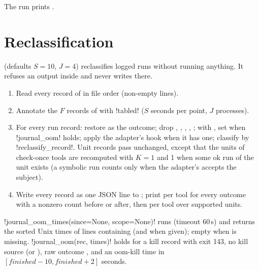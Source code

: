 The run prints .

\section{Reclassification}\label{sec:bench-reclassify}

 (defaults $S=10$, $J=4$) reclassifies logged runs without
running anything. It refuses an output inside  and never writes there.

\begin{algorithm}[Reclassification]
\begin{enumerate}
\item Read every record of  in file order (non-empty lines).
\item Annotate the $F$ records of  with \py!tabled! ($S$ seconds per point,
  $J$ processes).
\item For every run record: restore  as the outcome; drop ,
  , , , ; with
  , set  when \py!journal_oom! holds; apply the adapter's
   hook when it has one; classify by \py!reclassify_record!. Unit records pass
  unchanged, except that the units of check-once tools are recomputed with $K=1$ and
   1 when some ok run of the unit exists (a symbolic run counts only when the
  adapter's  accepts the subject).
\item Write every record as one JSON line to ; print per tool
   for every outcome with a nonzero count before or after, then per
  tool  over supported units.
\end{enumerate}
\end{algorithm}

\py!journal_oom_times(since=None, scope=None)! runs  (timeout 60\,s) and returns the sorted
Unix times of lines containing  (and  when given); empty when
 is missing. \py!journal_oom(rec, times)! holds for a kill record with exit 143,
no kill source (or ), raw outcome , and an oom-kill time in
$[\mathit{finished} - 10, \mathit{finished} + 2]$ seconds.

